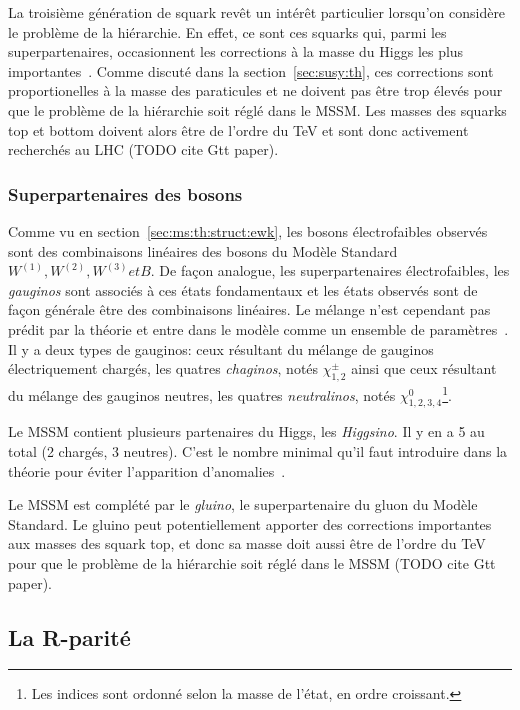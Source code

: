 La troisième génération de squark revêt un intérêt particulier
lorsqu'on considère le problème de la hiérarchie. En effet, ce sont
ces squarks qui, parmi les superpartenaires, occasionnent les
corrections à la masse du Higgs les plus
importantes~\cite{olive_susy2_2014}. Comme discuté dans la
section~\ref{sec:susy:th}, ces corrections sont proportionelles à la
masse des paraticules et ne doivent pas être trop élevés pour que le
problème de la hiérarchie soit réglé dans le MSSM. Les masses des
squarks top et bottom doivent alors être de l'ordre du TeV et sont
donc activement recherchés au LHC (TODO cite Gtt paper).

\subsubsection{Superpartenaires des bosons}
Comme vu en section~\ref{sec:ms:th:struct:ewk}, les bosons
électrofaibles observés sont des combinaisons linéaires des bosons du
Modèle Standard $W^{(1)}, W^{(2)}, W^{(3)} et B$. De façon analogue,
les superpartenaires électrofaibles, les \emph{gauginos} sont associés
à ces états fondamentaux et les états observés sont de façon générale
être des combinaisons linéaires. Le mélange n'est cependant pas prédit
par la théorie et entre dans le modèle comme un ensemble de
paramètres~\cite{olive_susy1_2014}. Il y a deux types de gauginos:
ceux résultant du mélange de gauginos électriquement chargés, les
quatres \emph{chaginos}, notés $\chi_{1,2}^\pm$ ainsi que ceux
résultant du mélange des gauginos neutres, les quatres
\emph{neutralinos}, notés $\chi_{1,2,3,4}^0$\footnote{Les indices sont
  ordonné selon la masse de l'état, en ordre
  croissant.}\cite{aad_summary_2015}.

Le MSSM contient plusieurs partenaires du Higgs, les
\emph{Higgsino}. Il y en a 5 au total (2 chargés, 3 neutres). C'est le
nombre minimal qu'il faut introduire dans la théorie pour éviter
l'apparition d'anomalies~\cite{olive_susy1_2014}.

Le MSSM est complété par le \emph{gluino}, le superpartenaire du gluon
du Modèle Standard. Le gluino peut potentiellement apporter des
corrections importantes aux masses des squark top, et donc sa masse
doit aussi être de l'ordre du TeV pour que le problème de la
hiérarchie soit réglé dans le MSSM (TODO cite Gtt paper).

\subsection{La R-parité}
\label{sec:susy:R}

